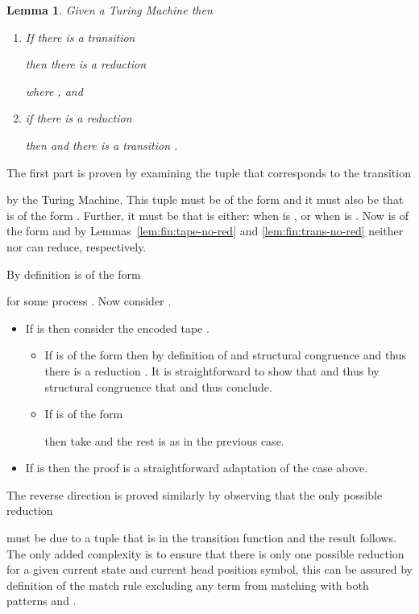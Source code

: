 \documentclass[submission,copyright,creativecommons]{eptcs}
\newtheorem{lemma}[theorem]{Lemma}
\newenvironment{proof}[1][Proof]{\begin{trivlist}
\item[\hskip \labelsep {\bfseries #1}]}{\end{trivlist}}
\begin{document}
\begin{lemma}
\label{lem:fin:faithful}
Given a Turing Machine 
then
\begin{enumerate}
\item If there is a transition

then there is a reduction

where , and
\item if there is a reduction

then  and
there is a transition
.
\end{enumerate}
\end{lemma}
\begin{proof}
The first part is proven by examining the tuple  that corresponds to the transition 

by the Turing Machine. This tuple must be of the form
 and it must also be that  is of the form
.
Further, it must be that  is either:
 when  is , or
 when  is .
Now 
is of the form
 and
by Lemmas~\ref{lem:fin:tape-no-red} and \ref{lem:fin:trans-no-red} neither 
nor  can reduce, respectively.

By definition  is of the form

for some process . 
Now consider .
\begin{itemize}
\item If  is  then consider the encoded tape .
  \begin{itemize}
  \item If  is of the form 
        then by definition of  and structural congruence  and thus there is a reduction
        .
        It is straightforward to show that 
        and thus by structural congruence that
         and thus conclude.
  \item If  is of the form
        
        then take  and the rest is as in the previous case.
  \end{itemize}
\item If  is  then the proof is a straightforward adaptation of the  case above.
\end{itemize}

The reverse direction is proved similarly by observing that the only possible reduction

must be due to a tuple  that is in the transition function 
and the result follows. The only added complexity is to ensure that there is only one possible
reduction for a given current state and current head position symbol, this can be assured by
definition of the match rule excluding any term from matching with both patterns
 and .
\end{proof}
\end{document}
